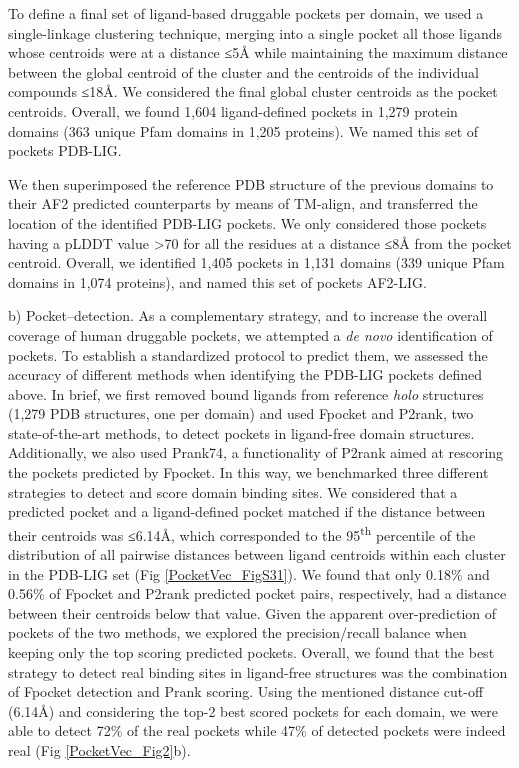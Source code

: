 To define a final set of ligand-based druggable pockets per domain, we used a single-linkage clustering technique, merging into a single pocket all those ligands whose centroids were at a distance ≤5Å while maintaining the maximum distance between the global centroid of the cluster and the centroids of the individual compounds ≤18Å. We considered the final global cluster centroids as the pocket centroids. Overall, we found 1,604 ligand-defined pockets in 1,279 protein domains (363 unique Pfam domains in 1,205 proteins). We named this set of pockets PDB-LIG.

We then superimposed the reference PDB structure of the previous domains to their AF2 predicted counterparts by means of TM-align\cite{zhang_tm-align_2005}, and transferred the location of the identified PDB-LIG pockets. We only considered those pockets having a pLDDT value >70 for all the residues at a distance ≤8Å from the pocket centroid. Overall, we identified 1,405 pockets in 1,131 domains (339 unique Pfam domains in 1,074 proteins), and named this set of pockets AF2-LIG.

b) Pocket--detection. As a complementary strategy, and to increase the overall coverage of human druggable pockets, we attempted a \textit{de novo} identification of pockets. To establish a standardized protocol to predict them, we assessed the accuracy of different methods when identifying the PDB-LIG pockets defined above. In brief, we first removed bound ligands from reference \textit{holo} structures (1,279 PDB structures, one per domain) and used Fpocket\cite{le_guilloux_fpocket_2009} and P2rank\cite{krivak_p2rank_2018}, two state-of-the-art methods, to detect pockets in ligand-free domain structures. Additionally, we also used Prank74, a functionality of P2rank aimed at rescoring the pockets predicted by Fpocket. In this way, we benchmarked three different strategies to detect and score domain binding sites. We considered that a predicted pocket and a ligand-defined pocket matched if the distance between their centroids was ≤6.14Å, which corresponded to the 95\textsuperscript{th} percentile of the distribution of all pairwise distances between ligand centroids within each cluster in the PDB-LIG set (Fig \ref{PocketVec_FigS31}). We found that only 0.18\% and 0.56\% of Fpocket and P2rank predicted pocket pairs, respectively, had a distance between their centroids below that value. Given the apparent over-prediction of pockets of the two methods, we explored the precision/recall balance when keeping only the top scoring predicted pockets. Overall, we found that the best strategy to detect real binding sites in ligand-free structures was the combination of Fpocket detection and Prank scoring. Using the mentioned distance cut-off (6.14Å) and considering the top-2 best scored pockets for each domain, we were able to detect 72\% of the real pockets while 47\% of detected pockets were indeed real (Fig \ref{PocketVec_Fig2}b).

